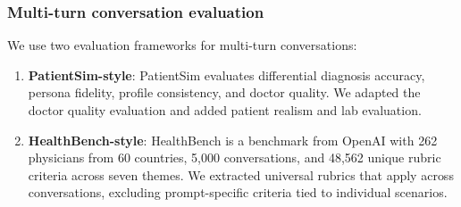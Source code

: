 
\subsubsection{Multi-turn conversation evaluation}

We use two evaluation frameworks for multi-turn conversations:
\begin{enumerate}
    \item \textbf{PatientSim-style}: PatientSim \cite{patientsim} evaluates differential diagnosis accuracy, persona fidelity, profile consistency, and doctor quality. We adapted the doctor quality evaluation and added patient realism and lab evaluation.
    \item \textbf{HealthBench-style}: HealthBench \cite{healthbench} is a benchmark from OpenAI with 262 physicians from 60 countries, 5,000 conversations, and 48,562 unique rubric criteria across seven themes. We extracted universal rubrics that apply across conversations, excluding prompt-specific criteria tied to individual scenarios.
\end{enumerate}




